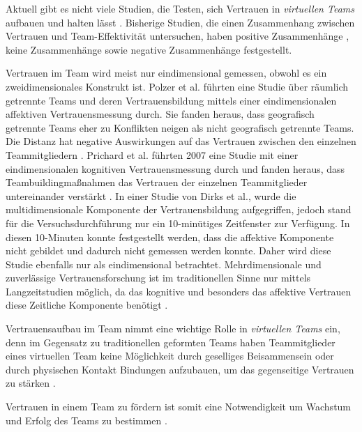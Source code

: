 \documentclass[a4paper,11pt]{article}%
\renewcommand{\\}{\vspace*{0.5\baselineskip} \newline}
\begin{document}
Aktuell gibt es nicht viele Studien, die Testen, sich Vertrauen in \textit{virtuellen Teams} aufbauen und halten lässt \citep[S.8-23]{duarte2006mastering}.
Bisherige Studien, die einen Zusammenhang zwischen Vertrauen und Team-Effektivität untersuchen, haben positive Zusammenhänge \citep{davis2000trusted}, keine Zusammenhänge \citep{hertel2004managing} sowie negative Zusammenhänge \citep{dirks1999effects} festgestellt.

Vertrauen im Team wird meist nur eindimensional gemessen, obwohl es ein zweidimensionales Konstrukt ist.
Polzer et al. führten eine Studie über räumlich getrennte Teams und deren Vertrauensbildung mittels einer eindimensionalen affektiven Vertrauensmessung durch. Sie fanden heraus, dass geografisch getrennte Teams eher zu Konflikten neigen als nicht geografisch getrennte Teams. Die Distanz hat negative Auswirkungen auf das Vertrauen zwischen den einzelnen Teammitgliedern \citep[S.682]{polzer2006extending}.
Prichard et al. führten 2007 eine Studie mit einer eindimensionalen kognitiven Vertrauensmessung durch und fanden heraus, dass Teambuildingmaßnahmen das Vertrauen der einzelnen Teammitglieder untereinander verstärkt \citep[S.704]{prichard2007effects}.
In einer Studie von Dirks et al., wurde die multidimensionale Komponente der Vertrauensbildung aufgegriffen, jedoch stand für die Versuchsdurchführung nur ein 10-minütiges Zeitfenster zur Verfügung. In diesen 10-Minuten konnte festgestellt werden, dass die affektive Komponente nicht gebildet und dadurch nicht gemessen werden konnte. Daher wird diese Studie ebenfalls nur als eindimensional betrachtet.
Mehrdimensionale und zuverlässige Vertrauensforschung ist im traditionellen Sinne nur mittels Langzeitstudien möglich, da das kognitive und besonders das affektive Vertrauen diese Zeitliche Komponente benötigt \citep{jones1998experience}.

Vertrauensaufbau im Team nimmt eine wichtige Rolle in \textit{virtuellen Teams} ein, denn im Gegensatz zu traditionellen geformten Teams haben Teammitglieder eines virtuellen Team keine Möglichkeit durch geselliges Beisammensein oder durch physischen Kontakt Bindungen aufzubauen, um das gegenseitige Vertrauen zu stärken \citep{TrustAndTheVirtualOrganisation}.

Vertrauen in einem Team zu fördern ist somit eine Notwendigkeit um Wachstum und Erfolg des Teams zu bestimmen \citep{glacel1997teamwork}.
\end{document}

